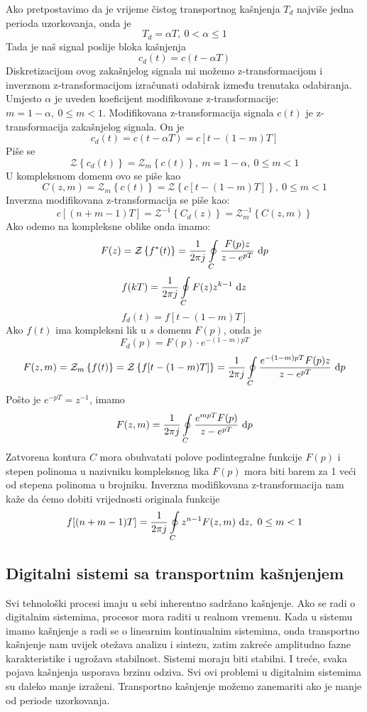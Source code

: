\documentclass{article}
\newcommand{\z}[1]{\mathcal Z \left\{ #1 \right\} }
\newcommand{\zm}[1]{\mathcal Z_m \left\{ #1 \right\} }
\newcommand{\invzm}[1]{\mathcal Z_m^{-1} \left\{ #1 \right\} }
\newcommand{\invz}[1]{\mathcal Z^{-1} \left\{ #1 \right\} }
\begin{document}
	Ako pretpostavimo da je vrijeme čistog transportnog kašnjenja $T_d$ najviše jedna perioda uzorkovanja, onda je
		$$T_d = \alpha T,\ 0<\alpha\le1$$
	Tada je naš signal poslije bloka kašnjenja
		$$c_d(t) = c(t-\alpha T)$$
	Diskretizacijom ovog zakašnjelog signala mi možemo z-transformacijom i inverznom z-transformacijom izračunati odabirak između trenutaka odabiranja. Umjesto $\alpha$ je uveden koeficijent modifikovane z-transformacije: $m = 1-\alpha,\ 0\le m < 1$.
	Modifikovana z-transformacija signala $c(t)$ je z-transformacija zakašnjelog signala. On je
		$$c_d(t) = c(t-\alpha T) = c[t-(1-m)T]$$
	Piše se
		$$\z{c_d(t)} = \zm{c(t)},\ m=1-\alpha,\ 0 \le m < 1$$
	U kompleksnom domenu ovo se piše kao
		$$C(z,m) = \zm{c(t)} = \z{c[t-(1-m)T]},\ 0 \le m < 1$$
	Inverzna modifikovana z-transformacija se piše kao:
		$$c[(n+m-1)T] = \invz{C_d(z)} = \invzm{C(z,m)}$$
	Ako odemo na kompleksne oblike onda imamo:
		$$F(z) = \z{f^*(t)} = \frac{1}{2\pi j} \oint\limits_C \frac{F(p)z}{z-e^{pT}}\ \text dp$$
		$$f(kT) = \frac{1}{2\pi j} \oint\limits_C F(z) z^{k-1}\ \text dz$$
		$$f_d(t) = f[t-(1-m)T]$$
	Ako $f(t)$ ima kompleksni lik u $s$ domenu $F(p)$, onda je
		$$F_d(p) = F(p) \cdot e^{-(1-m)pT}$$
		$$F(z,m) = \zm{f(t)} = \z{f[t-(1-m)T]} = \frac{1}{2\pi j} \oint\limits_C \frac{e^{-(1-m)pT}F(p)z}{z-e^{pT}}\ \text dp$$
	Pošto je $e^{-pT} = z^{-1}$, imamo
		$$F(z,m) = \frac{1}{2\pi j} \oint\limits_C \frac{e^{mpT}F(p)}{z-e^{pT}}\ \text dp$$
	Zatvorena kontura $C$ mora obuhvatati polove podintegralne funkcije $F(p)$ i stepen polinoma u nazivniku kompleksnog lika $F(p)$ mora biti barem za 1 veći od stepena polinoma u brojniku. Inverzna modifikovana z-transformacija nam kaže da ćemo dobiti vrijednosti originala funkcije
		$$f[(n+m-1)T] = \frac{1}{2\pi j} \oint\limits_C z^{n-1} F(z,m)\ \text dz,\ 0\le m < 1$$
	
	\subsection*{Digitalni sistemi sa transportnim kašnjenjem}
	
	Svi tehnološki procesi imaju u sebi inherentno sadržano kašnjenje. Ako se radi o digitalnim sistemima, procesor mora raditi u realnom vremenu. Kada u sistemu imamo kašnjenje a radi se o linearnim kontinualnim sistemima, onda transportno kašnjenje nam uvijek otežava analizu i sintezu, zatim zakreće amplitudno fazne karakteristike i ugrožava stabilnost. Sistemi moraju biti stabilni. I treće, svaka pojava kašnjenja usporava brzinu odziva. Svi ovi problemi u digitalnim sistemima su daleko manje izraženi. Transportno kašnjenje možemo zanemariti ako je manje od periode uzorkovanja.
	
\end{document}
